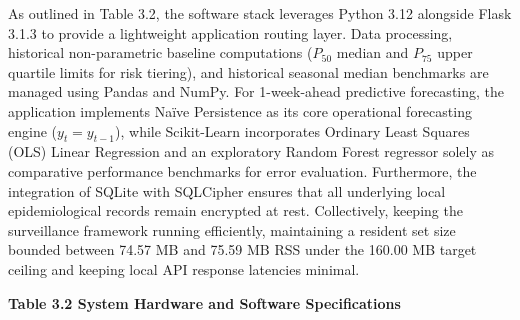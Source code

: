 \documentclass[
]{article}
\begin{document}
As outlined in Table 3.2, the software stack leverages Python 3.12
alongside Flask 3.1.3 to provide a lightweight application routing
layer. Data processing, historical non-parametric baseline computations
(\(P_{50}\) median and \(P_{75}\) upper quartile limits for risk
tiering), and historical seasonal median benchmarks are managed using
Pandas and NumPy. For 1-week-ahead predictive forecasting, the
application implements Naïve Persistence as its core operational
forecasting engine (\(y_{t} = y_{t - 1}\)), while Scikit-Learn
incorporates Ordinary Least Squares (OLS) Linear Regression and an
exploratory Random Forest regressor solely as comparative performance
benchmarks for error evaluation. Furthermore, the integration of SQLite
with SQLCipher ensures that all underlying local epidemiological records
remain encrypted at rest. Collectively, keeping the surveillance
framework running efficiently, maintaining a resident set size bounded
between 74.57 MB and 75.59 MB RSS under the 160.00 MB target ceiling and
keeping local API response latencies minimal.

\textbf{Table 3.2 System Hardware and Software Specifications}
\end{document}
